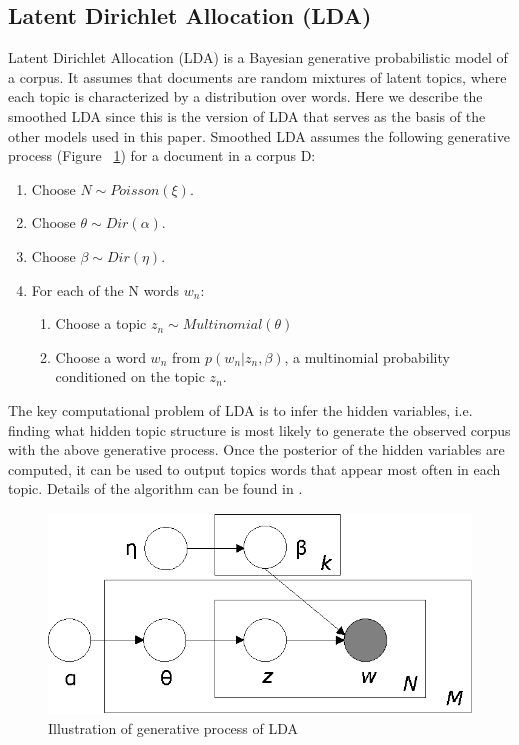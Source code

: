 \documentclass[DIV=calc, paper=letter, fontsize=10pt, twocolumn]{scrartcl}	 %
\begin{document}
\subsection*{Latent Dirichlet Allocation (LDA)}
Latent Dirichlet Allocation (LDA) \cite{1} is a Bayesian generative probabilistic model of a corpus. It assumes that documents are random mixtures of latent topics, where each topic is characterized by a distribution over words. Here we describe the smoothed LDA since this is the version of LDA that serves as the basis of the other models used in this paper.
Smoothed LDA assumes the following generative process (Figure ~\ref{fig: LDA}) for a document in a corpus D:
\begin{enumerate}
  \item Choose $N \sim Poisson(\xi)$.
  \item Choose $\theta \sim Dir(\alpha)$.
  \item Choose $\beta \sim Dir(\eta)$.
  \item For each of the N words $w_n$:
  	\begin{enumerate}
  	  	\item Choose a topic $z_n \sim  Multinomial(\theta)$
    		\item Choose a word $w_n$ from $p(w_n|z_n, \beta)$, a multinomial probability conditioned on the topic $z_n$.
  	\end{enumerate}
\end{enumerate}
The key computational problem of LDA is to infer the hidden variables, i.e. finding what hidden topic structure is most likely to generate the observed corpus with the above generative process. Once the posterior of the hidden variables are computed, it can be used to output topics words that appear most often in each topic. Details of the algorithm can be found in \cite{1}.
			\begin{figure}[!ht]
				\centerline{\includegraphics[scale = 0.8]{BleiNgJordan2003.eps}}
				\caption{Illustration of generative process of LDA \cite{1}}
				\label{fig: LDA}
			\end{figure}
\end{document}
